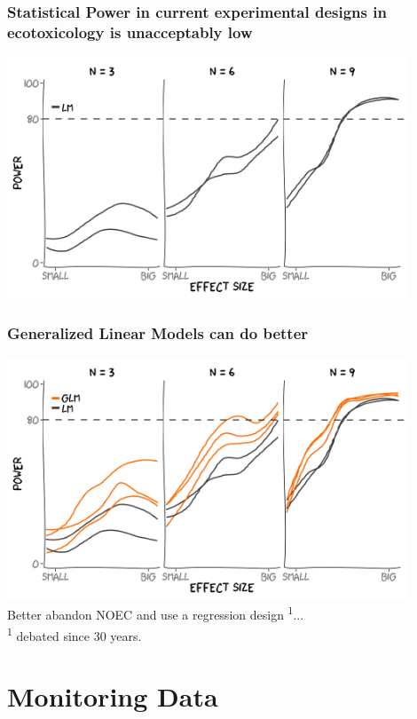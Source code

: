 \documentclass[12pt
, t
]{beamer}
\begin{document}
\begin{frame}
\frametitle{Statistical Power in current experimental designs in ecotoxicology is unacceptably low}
\center
\includegraphics[width = 0.9\textwidth]{fig/glm2.png} \\
\end{frame}


\begin{frame}
\frametitle{Generalized Linear Models can do better}
\center
\includegraphics[width = 0.9\textwidth]{fig/glm1.png} \\
\pause
\center
Better abandon NOEC and use a regression design \textsuperscript{1}...\\
\tiny \textsuperscript{1} debated since 30 years.
\end{frame}



\section{Monitoring Data}
\subsection{}
\end{document}
